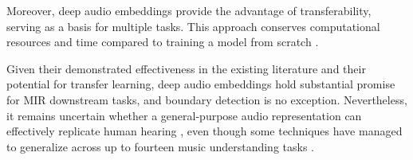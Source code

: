 Moreover, deep audio embeddings provide the advantage of transferability, serving as a basis for multiple tasks. This approach conserves computational resources and time compared to training a model from scratch \cite{HamelTransferSimilarity}.

Given their demonstrated effectiveness in the existing literature and their potential for transfer learning, deep audio embeddings hold substantial promise for MIR downstream tasks, and boundary detection is no exception. Nevertheless, it remains uncertain whether a general-purpose audio representation can effectively replicate human hearing \cite{Turian2022HEAR:Representations}, even though some techniques have managed to generalize across up to fourteen music understanding tasks \cite{Li2023MERT:Training}.